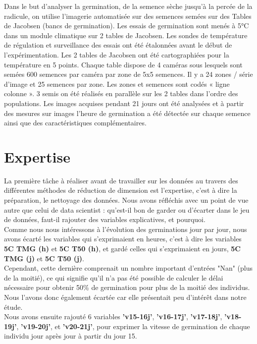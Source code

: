 \documentclass[12pt]{article}
\begin{document}
Dans le but d'analyser la germination, de la semence sèche jusqu’à la percée de la radicule, on utilise l'imagerie automatisée sur des semences semées sur des Tables de Jacobsen (bancs de germination).
Les essais de germination sont menés à 5°C dans un module climatique sur 2 tables de Jacobsen. Les sondes de température de régulation et surveillance des essais ont été étalonnées avant le début de l’expérimentation. Les 2 tables de Jacobsen ont été cartographiées pour la température en 5 points.
Chaque table dispose de 4 caméras sous lesquels sont semées 600 semences par caméra par zone de 5x5 semences. Il y a 24 zones / série d’image et 25 semences par zone. Les zones et semences sont codés « ligne colonne ».
3 semis on été réalisés en parallèle sur les 2 tables dans l’ordre des populations.
Les images acquises pendant 21 jours ont été analysées et à partir des mesures sur images l’heure de germination a été détectée sur chaque semence ainsi que des caractéristiques complémentaires.\\

    
\section{Expertise}

La première tâche à réaliser avant de travailler sur les données au travers des différentes méthodes de réduction de dimension est l'expertise, c'est à dire la préparation, le nettoyage des données. Nous avons réfléchis avec un point de vue autre que celui de data scientist : qu'est-il bon de garder ou d'écarter dans le jeu de données, faut-il rajouter des variables explicatives, et pourquoi.\\

Comme nous nous intéressons à l'évolution des germinations jour par jour, nous avons écarté les variables qui s'exprimaient en heures, c'est à dire les variables \textbf{5\textdegree C TMG (h)} et \textbf{5\textdegree C T50 (h)}, et gardé celles qui s'exprimaient en jours, \textbf{5\textdegree C TMG (j)} et \textbf{5\textdegree C T50 (j)}.\\
Cependant, cette dernière comprenait un nombre important d'entrées "Nan" (plus de la moitié), ce qui signifie qu'il n'a pas été possible de calculer le délai nécessaire pour obtenir 50\% de germination pour plus de la moitié des individus. Nous l'avons donc également écartée car elle présentait peu d'intérêt dans notre étude.\\

Nous avons ensuite rajouté 6 variables \textbf{'v15-16j'}, \textbf{'v16-17j'}, \textbf{'v17-18j'}, \textbf{'v18-19j'}, \textbf{'v19-20j'}, et \textbf{'v20-21j'},  pour exprimer la vitesse de germination de chaque individu jour après jour à partir du jour 15.
\end{document}
